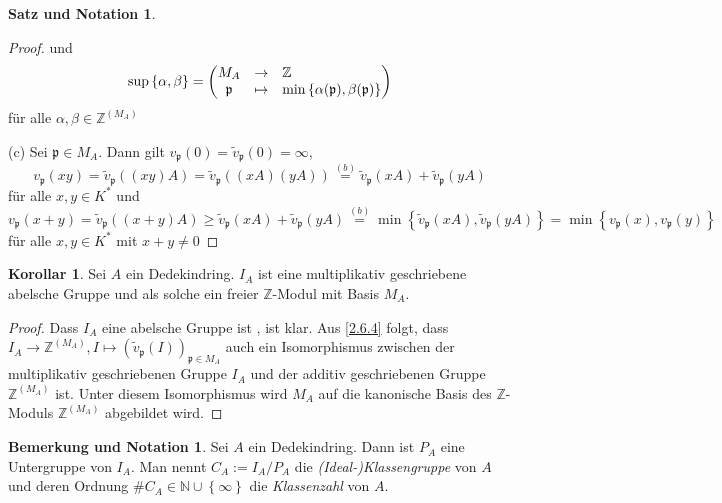 \documentclass[
twoside=semi,
fontsize=12,
DIV=12, 
cleardoublepage=current,
leqno,
headings=optiontoheadandtoc, 
toc=idx
]{scrbook}
\newcommand{\N}{\mathbb{N}}
\newcommand{\Z}{\mathbb{Z}}
\newcommand{\set}[1]{\left\{ #1 \right\}}
\theoremstyle{definition}
\newtheorem{korollar}[definition]{Korollar}
\newtheorem{satz-not}[definition]{Satz und Notation}
\newtheorem{bem-not}[definition]{Bemerkung und Notation}
\begin{document}
\begin{satz-not}
\begin{proof}
 			und 
 			\[\sup \set{\alpha, \beta} = \begin{pmatrix}
 					M_A &\to& \Z\hfill\\
 					\mathfrak{p} &\mapsto& \min \set{\alpha(\mathfrak{p}), \beta(\mathfrak{p})}
 			\end{pmatrix}\] 
 			f\"ur alle $\alpha, \beta \in \Z^{(M_A)}$
 		
 			(c) Sei $\mathfrak{p} \in M_A$. Dann gilt $v_\mathfrak{p}(0) = \tilde{v}_\mathfrak{p}(0) = \infty$, 
 			\[v_\mathfrak{p}(xy) = \tilde{v}_\mathfrak{p}((xy)A) = \tilde{v}_\mathfrak{p}((xA)(yA)) \overset{(b)}{=} \tilde{v}_\mathfrak{p}(xA) + \tilde{v}_\mathfrak{p}(yA)\] f\"ur alle $x, y\in K^*$ und 
 			\[v_\mathfrak{p}(x+y) = \tilde{v}_\mathfrak{p}((x+y)A) \geq \tilde{v}_\mathfrak{p}(xA) + \tilde{v}_\mathfrak{p}(yA) \overset{(b)}{=} \min \set{\tilde{v}_\mathfrak{p}(xA), \tilde{v}_\mathfrak{p}(yA)} = \min \set{v_\mathfrak{p}(x), v_\mathfrak{p}(y)}\] f\"ur alle $x,y \in K^*$ mit $x+y\neq 0$
 		\end{proof}
 	\end{satz-not}
 
 	\begin{korollar}\label{2.6.5}\hfill\newline
 		Sei $A$ ein Dedekindring. $I_A$ ist eine multiplikativ geschriebene abelsche Gruppe und als solche ein freier $\Z$-Modul mit Basis $M_A$.
 		
 		\begin{proof}
 			Dass $I_A$ eine abelsche Gruppe ist , ist klar. Aus \ref{2.6.4} folgt, dass \linebreak  $I_A \to \Z^{(M_A)}, I \mapsto  (\tilde{v}_\mathfrak{p}(I))_{\mathfrak{p} \in M_A}$ auch ein Isomorphismus zwischen der multiplikativ geschriebenen Gruppe $I_A$ und der additiv geschriebenen Gruppe $\Z^{(M_A)}$ ist. Unter diesem Isomorphismus wird $M_A$ auf die kanonische Basis des $\Z$-Moduls $\Z^{(M_A)}$ abgebildet wird. 
 		\end{proof}
 	\end{korollar}
 
 	\begin{bem-not}\label{2.6.6}\hfill\newline
 		Sei $A$ ein Dedekindring. Dann ist $P_A$ eine Untergruppe von $I_A$. Man nennt $C_A := I_A /P_A$ die \emph{(Ideal-)Klassengruppe} von $A$ und deren Ordnung $\#C_A \in \N \cup \set{\infty}$ die \emph{Klassenzahl} von $A$. 
 	\end{bem-not}
 
\end{document}
